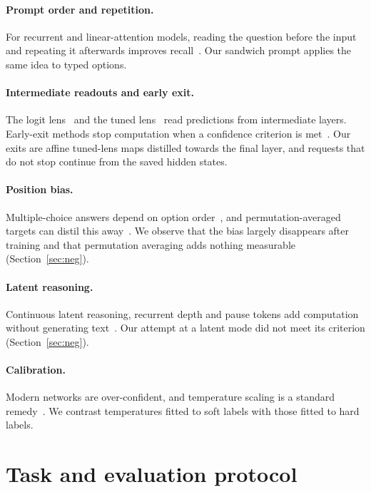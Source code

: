 \documentclass[10pt]{article}
\begin{document}
\paragraph{Prompt order and repetition.}
For recurrent and linear-attention models, reading the question before the input and repeating it afterwards improves recall~\cite{arora,leviathan}. Our sandwich prompt applies the same idea to typed options.

\paragraph{Intermediate readouts and early exit.}
The logit lens~\cite{logitlens} and the tuned lens~\cite{tunedlens} read predictions from intermediate layers. Early-exit methods stop computation when a confidence criterion is met~\cite{calm,layerskip}. Our exits are affine tuned-lens maps distilled towards the final layer, and requests that do not stop continue from the saved hidden states.

\paragraph{Position bias.}
Multiple-choice answers depend on option order~\cite{pride,pine}, and permutation-averaged targets can distil this away~\cite{liusie}. We observe that the bias largely disappears after training and that permutation averaging adds nothing measurable (Section~\ref{sec:neg}).

\paragraph{Latent reasoning.}
Continuous latent reasoning, recurrent depth and pause tokens add computation without generating text~\cite{coconut,recdepth,pause}. Our attempt at a latent mode did not meet its criterion (Section~\ref{sec:neg}).

\paragraph{Calibration.}
Modern networks are over-confident, and temperature scaling is a standard remedy~\cite{guo}. We contrast temperatures fitted to soft labels with those fitted to hard labels.

\section{Task and evaluation protocol}
\label{sec:task}
\end{document}
